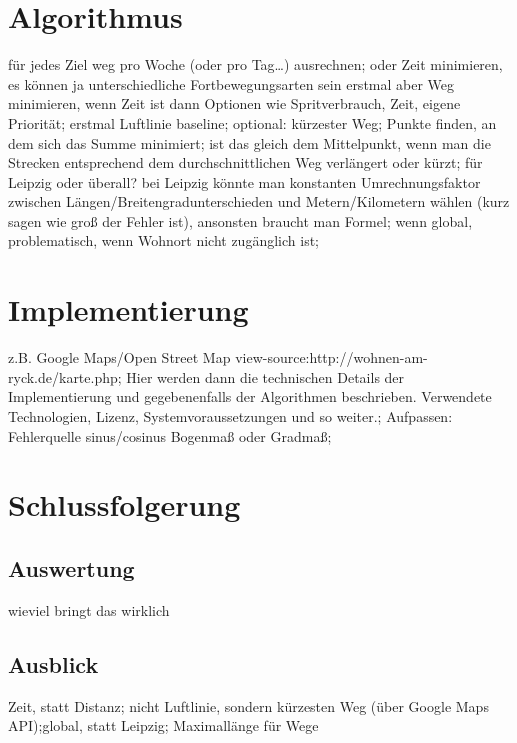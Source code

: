 \documentclass[a4paper, twoside, 12pt]{scrreprt}
\begin{document}
\chapter{Algorithmus}
für jedes Ziel weg pro Woche (oder pro Tag…) ausrechnen;
oder Zeit minimieren, es können ja unterschiedliche Fortbewegungsarten sein
erstmal aber Weg minimieren, wenn Zeit ist dann Optionen wie Spritverbrauch, Zeit, eigene Priorität;
erstmal Luftlinie baseline;
optional: kürzester Weg;
Punkte finden, an dem sich das Summe minimiert;
ist das gleich dem Mittelpunkt, wenn man die Strecken entsprechend dem durchschnittlichen Weg verlängert oder kürzt;
für Leipzig oder überall? bei Leipzig könnte man konstanten Umrechnungsfaktor zwischen Längen/Breitengradunterschieden und Metern/Kilometern wählen (kurz sagen wie groß der Fehler ist), ansonsten braucht man Formel;
wenn global, problematisch, wenn Wohnort nicht zugänglich ist;
\chapter{Implementierung}
z.B. Google Maps/Open Street Map view-source:http://wohnen-am-ryck.de/karte.php;
Hier werden dann die technischen Details der Implementierung und gegebenenfalls der Algorithmen beschrieben. Verwendete Technologien, Lizenz, Systemvoraussetzungen und so weiter.;
Aufpassen: Fehlerquelle sinus/cosinus Bogenmaß oder Gradmaß;
\chapter{Schlussfolgerung}
\section{Auswertung}
wieviel bringt das wirklich
\section{Ausblick}
Zeit, statt Distanz; nicht Luftlinie, sondern kürzesten Weg (über Google Maps API);global, statt Leipzig; Maximallänge für Wege
{}

\end{document}
